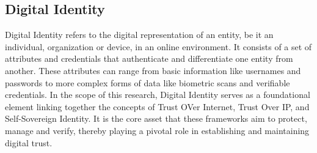 \subsection{Digital Identity}

Digital Identity refers to the digital representation of an entity, be it an individual, organization or device, in an online environment. It consists of a set of attributes and credentials that authenticate and differentiate one entity from another. These attributes can range from basic information like usernames and passwords to more complex forms of data like biometric scans and verifiable credentials. In the scope of this research, Digital Identity serves as a foundational element linking together the concepts of Trust OVer Internet, Trust Over IP, and Self-Sovereign Identity. It is the core asset that these frameworks aim to protect, manage and verify, thereby playing a pivotal role in establishing and maintaining digital trust.
